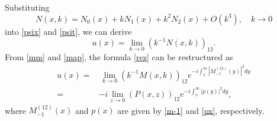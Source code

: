\documentclass[preprint,compress,12pt]{elsarticle}
\numberwithin{equation}{section}
\begin{document}
Substituting
\begin{equation}
N(x,k)=N_{0}(x)+kN_{1}(x)+k^{2}N_{2}(x)+O(k^{3}),\quad k\rightarrow0
\end{equation}
into \eqref{psix} and \eqref{psit}, we can derive
\begin{equation}\label{rez}
u(x)=\lim_{k\rightarrow0}\left(k^{-1}N(x,k)\right)_{12}.
\end{equation}
From \eqref{mm} and \eqref{map}, the  formula \eqref{rez} can be restructured as
\begin{equation}\label{recp2}
\begin{aligned}
u(x)=&\,\lim_{k\rightarrow0}\left(k^{-1}M(x,k)\right)_{12}e^{-i\int_{x}^{\infty}|M_{-1}^{(12)}(y)|^{2}dy}\\
=&-i\lim_{z\rightarrow0}\left(P(x,z)\right)_{12}e^{-i\int_{x}^{\infty}|p(y)|^{2}dy},
\end{aligned}
\end{equation}
where $M_{-1}^{(12)}(x)$ and $p(x)$ are given by \eqref{m-1} and \eqref{px}, respectively.
\end{document}
